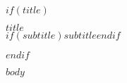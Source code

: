 \documentclass[11pt,a4paper,$document.lang$,
$for(classoption)$
  $classoption$$sep$,
$endfor$$if(subclass)$,$subclass$$endif$]{article}
\theoremstyle{blackbox}
\begin{document}
$if(title)$
\begin{center}
\Huge \textsc{\textbf{$title$}} \\
$if(subtitle)$\large\textbf{$subtitle$}$endif$
\end{center}
$endif$

$body$
\end{document}
